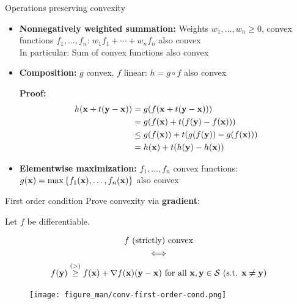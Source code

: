 \documentclass[11pt,compress,t,notes=noshow, xcolor=table]{beamer}
\begin{document}
\begin{vbframe}{Operations preserving convexity}

\begin{itemize}
    \item \textbf{Nonnegatively weighted summation:} Weights $w_1,\ldots,w_n\geq0$, convex functions $f_1,\ldots,f_n$:
        $w_1f_1 + \cdots + w_nf_n$ also convex \\
        In particular: Sum of convex functions also convex
    \item \textbf{Composition:} $g$ convex, $f$ linear: $h = g \circ f$ also convex

        \begin{footnotesize}
            \textbf{Proof:}
            \begin{align*}
                h(\mathbf{x} + t(\mathbf{y}-\mathbf{x})) &= g(f(\mathbf{x} + t(\mathbf{y}-\mathbf{x}))) \\
                &= g(f(\mathbf{x}) + t(f(\mathbf{y}) - f(\mathbf{x}))) \\
                &\leq g(f(\mathbf{x})) + t(g(f(\mathbf{y})) - g(f(\mathbf{x}))) \\
                &= h(\mathbf{x}) + t(h(\mathbf{y}) - h(\mathbf{x}))
            \end{align*}
        \end{footnotesize}
    \item \textbf{Elementwise maximization:} $f_1,\ldots,f_n$ convex functions: $g(\mathbf{x}) = \max\left\lbrace f_1(\mathbf{x}),\ldots,f_n(\mathbf{x}) \right\rbrace$ also convex
\end{itemize}

\end{vbframe}


\begin{vbframe}{First order condition}
Prove convexity via \textbf{gradient}:



    Let $f$ be differentiable.

    \vspace{-\baselineskip}

    \begin{gather*}
        \textnormal{$f$ (strictly) convex} \\
        \Longleftrightarrow \\
        f(\mathbf{y}) \overset{(>)}{\geq} f(\mathbf{x}) + \nabla f(\mathbf{x}) (\mathbf{y}-\mathbf{x}) \textnormal{ for all $\mathbf{x},\mathbf{y}\in\mathcal{S}$ (s.t. $\mathbf{x} \not= \mathbf{y}$)}
    \end{gather*}


\vspace{-0.2cm}

\begin{figure}
    \centering
    \texttt{[image: figure\_man/conv-first-order-cond.png]}
\end{figure}

\end{vbframe}
\end{document}
